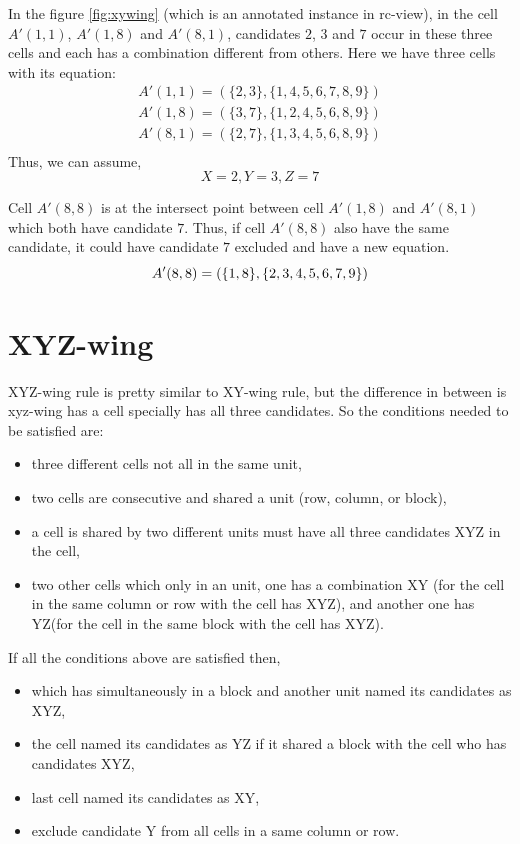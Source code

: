\documentclass[11pt]{report}
\newcommand{\set}[1]{\{ #1 \}}
\begin{document}
In the figure \ref{fig:xywing} (which is an annotated instance in rc-view), in the cell $A'(1,1)$, $A'(1,8)$ and $A'(8,1)$, candidates $2$, $3$ and $7$ occur in these three cells and each has a combination different from others. Here we have three cells with its equation:
\begin{eqnarray*}
A'(1,1) = (\set{2, 3}, \set{1, 4, 5, 6, 7, 8, 9})\\
A'(1,8) = (\set{3, 7}, \set{1, 2, 4, 5, 6, 8, 9})\\
A'(8,1) = (\set{2, 7}, \set{1, 3, 4, 5, 6, 8, 9})\\
\end{eqnarray*}
Thus, we can assume,
\begin{displaymath}
X = 2, Y = 3, Z = 7
\end{displaymath}

Cell $A'(8,8)$ is at the intersect point between cell $A'(1,8)$ and $A'(8,1)$ which both have candidate $7$. Thus, if cell $A'(8,8)$ also have the same candidate, it could have candidate $7$ excluded and have a new equation.
\begin{displaymath}
A'(8,8) = (\set{1, 8}, \set{2, 3, 4, 5, 6, 7, 9})\\
\end{displaymath}



\section{XYZ-wing}
\label{sec:XYZ-wing}

XYZ-wing rule is pretty similar to XY-wing rule, but the difference in between is xyz-wing has a cell specially has all three candidates. So the conditions needed to be satisfied are:
\begin{itemize}
\item three different cells not all in the same unit,
\item two cells are consecutive and shared a unit (row, column, or block),
\item a cell is shared by two different units must have all three candidates XYZ in the cell,
\item two other cells which only in an unit, one has a combination XY (for the cell in the same column or row with the cell has XYZ), and another one has YZ(for the cell in the same block with the cell has XYZ).
\end{itemize}

If all the conditions above are satisfied then,
\begin{itemize}
\item which has simultaneously in a block and another unit named its candidates as XYZ,
\item the cell named its candidates as YZ if it shared a block with the cell who has candidates XYZ,
\item last cell named its candidates as XY,
\item exclude candidate Y from all cells in a same column or row.
\end{itemize}
\end{document}
